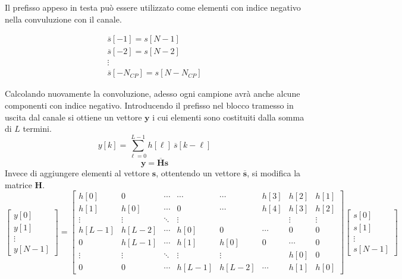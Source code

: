 Il prefisso appeso in testa può essere utilizzato come elementi con indice negativo nella convuluzione con il canale.



\[
    \begin{array}{ll}
        \overline{s}[-1] = s[N - 1] \\
        \overline{s}[-2] = s[N - 2] \\
        \vdots \\
        \overline{s}[-N_{CP}] = s[N - N_{CP}]
    \end{array}
\]



Calcolando nuovamente la convoluzione, adesso ogni campione avrà anche alcune componenti con indice negativo.
Introducendo il prefisso nel blocco tramesso in uscita dal canale si ottiene un vettore $\mathbf{y}$ i cui elementi sono costituiti dalla somma di $L$ termini.
\[
    y[k] = \sum_{\ell=0}^{L-1} h[\ell] \ \overline{s}[k-\ell]
\]
\[
    \mathbf{y} = \mathbf{\overline{H}} \mathbf{s}
\]
Invece di aggiungere elementi al vettore $\mathbf{s}$, ottentendo un vettore $\mathbf{\overline{s}}$, si modifica la matrice $\mathbf{H}$.
\[ 
\begin{bmatrix} y[0] \\ y[1] \\ \vdots \\ y[N-1] \end{bmatrix} 
= 
\begin{bmatrix}
    h[0] & 0 & \cdots & \cdots & \cdots & h[3] & h[2] & h[1] \\
    h[1] & h[0] & \cdots & 0 & \cdots & h[4] & h[3] & h[2] \\
    \vdots & \vdots & \ddots & \vdots & &  & \vdots & \vdots \\
    h[L-1] & h[L-2] & \cdots & h[0] & 0 & \cdots & 0 & 0 \\
    0 & h[L-1] & \cdots & h[1] & h[0] & 0 & \cdots & 0 \\
    \vdots & \vdots & \ddots & \vdots & \vdots & & h[0] & 0 \\
    0 & 0 & \cdots & h[L-1] & h[L-2] & \cdots & h[1] & h[0]
\end{bmatrix}   
\begin{bmatrix} s[0] \\ s[1] \\ \vdots \\ s[N-1] \end{bmatrix}
\]



